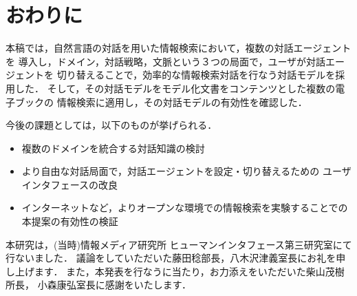 \section{おわりに}
本稿では，自然言語の対話を用いた情報検索において，複数の対話エージェントを
導入し，ドメイン，対話戦略，文脈という３つの局面で，ユーザが対話エージェントを
切り替えることで，効率的な情報検索対話を行なう対話モデルを採用した．
そして，その対話モデルをモデル化文書をコンテンツとした複数の電子ブックの
情報検索に適用し，その対話モデルの有効性を確認した．

今後の課題としては，以下のものが挙げられる．
\begin{itemize}
\item 複数のドメインを統合する対話知識の検討
\item より自由な対話局面で，対話エージェントを設定・切り替えるための
ユーザインタフェースの改良
\item インターネットなど，よりオープンな環境での情報検索を実験することでの
本提案の有効性の検証
\end{itemize}

\acknowledgment

本研究は，(当時)情報メディア研究所 ヒューマンインタフェース第三研究室にて
行ないました．
議論をしていただいた藤田稔部長，八木沢津義室長にお礼を申し上げます．
また，本発表を行なうに当たり，お力添えをいただいた柴山茂樹所長，
小森康弘室長に感謝をいたします．





\begin{biography}

\end{biography}


